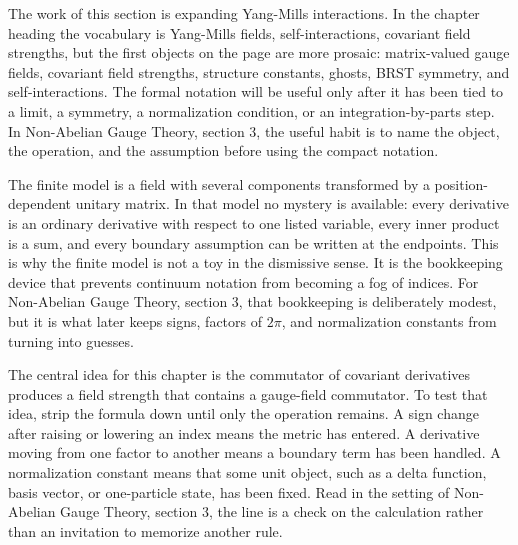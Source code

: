 











The work of this section is expanding Yang-Mills interactions.  In the chapter heading the vocabulary is Yang-Mills fields, self-interactions, covariant field strengths, but the first objects on the page are more prosaic: matrix-valued gauge fields, covariant field strengths, structure constants, ghosts, BRST symmetry, and self-interactions.  The formal notation will be useful only after it has been tied to a limit, a symmetry, a normalization condition, or an integration-by-parts step.  In Non-Abelian Gauge Theory, section 3, the useful habit is to name the object, the operation, and the assumption before using the compact notation.

The finite model is a field with several components transformed by a position-dependent unitary matrix.  In that model no mystery is available: every derivative is an ordinary derivative with respect to one listed variable, every inner product is a sum, and every boundary assumption can be written at the endpoints.  This is why the finite model is not a toy in the dismissive sense.  It is the bookkeeping device that prevents continuum notation from becoming a fog of indices.  For Non-Abelian Gauge Theory, section 3, that bookkeeping is deliberately modest, but it is what later keeps signs, factors of \(2\pi\), and normalization constants from turning into guesses.

The central idea for this chapter is the commutator of covariant derivatives produces a field strength that contains a gauge-field commutator.  To test that idea, strip the formula down until only the operation remains.  A sign change after raising or lowering an index means the metric has entered.  A derivative moving from one factor to another means a boundary term has been handled.  A normalization constant means that some unit object, such as a delta function, basis vector, or one-particle state, has been fixed.  Read in the setting of Non-Abelian Gauge Theory, section 3, the line is a check on the calculation rather than an invitation to memorize another rule.

